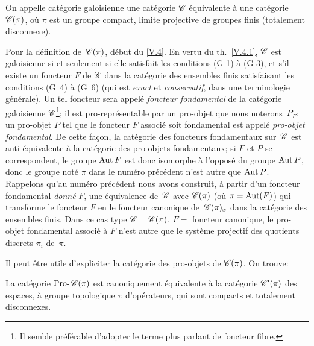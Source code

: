 \begin{definition}
\label{V.5.1}
On appelle cat\'egorie galoisienne
une cat\'egorie $\cal{C}$ \'equivalente \`a une cat\'egorie
$\cal{C}(\pi)$, o\`u $\pi$ est un groupe compact, limite projective
de groupes finis (\ie totalement disconnexe).

Pour la d\'efinition de~$\cal{C}(\pi)$, \cf d\'ebut du \No \ref{V.4}. En
vertu du th.\, \ref{V.4.1}, $\cal{C}$ est galoisienne si et seulement si
elle satisfait les conditions (G 1) \`a (G 3), et s'il existe un
foncteur $F$ de
$\cal{C}$
dans la cat\'egorie des ensembles finis satisfaisant les conditions
(G~4) \`a (G~6) (\ie qui est \emph{exact} et \emph{conservatif},
dans une terminologie g\'en\'erale). Un tel foncteur sera
appel\'e \emph{foncteur fondamental}
de la cat\'egorie galoisienne $\cal{C}$\footnote{Il semble pr\'ef\'erable d'adopter le terme plus parlant
de \og foncteur fibre\fg.};
il est pro-repr\'esentable par un pro-objet que nous noterons~$P_F$;
un pro-objet $P$ tel que le foncteur $F$ associ\'e soit fondamental
est appel\'e \emph{pro-objet fondamental}.
De cette fa\c con, la cat\'egorie des foncteurs fondamentaux sur~$\cal{C}$ est anti-\'equivalente \`a la cat\'egorie des
pro-objets fondamentaux; si $F$ et $P$ se correspondent, le groupe
$\operatorname{Aut} F$ est donc isomorphe \`a l'oppos\'e du groupe $\operatorname{Aut} P$,
donc le groupe not\'e $\pi$ dans le num\'ero pr\'ec\'edent
n'est autre que $\operatorname{Aut} P$. Rappelons qu'au num\'ero pr\'ec\'edent
nous avons construit, \`a partir d'un foncteur fondamental
\emph{donné} $F$, une \'equivalence de~$\cal{C}$ avec
$\cal{C}(\pi)$ (o\`u $\pi=\operatorname{Aut}(F)$) qui transforme le foncteur $F$
en le foncteur canonique de~$\cal{C}(\pi)_x$ dans la cat\'egorie des
ensembles finis. Dans ce cas type $\cal{C}=\cal{C}(\pi)$, $F=$
foncteur canonique, le pro-objet fondamental associ\'e \`a $F$
n'est autre que le syst\`eme projectif des quotients discrets
$\pi_i$ de~$\pi$.
\end{definition}

Il peut \^etre utile d'expliciter la cat\'egorie des pro-objets de
$\cal{C}(\pi)$. On trouve:

\begin{proposition}
\label{V.5.2}
La cat\'egorie $\Prodash\cal{C}(\pi)$
\label{indnot:ed}est canoniquement \'equivalente \`a la cat\'egorie
$\cal{C}'(\pi)$ des espaces, \`a groupe topologique $\pi$
d'op\'erateurs, qui sont compacts et totalement disconnexes.
\end{proposition}

